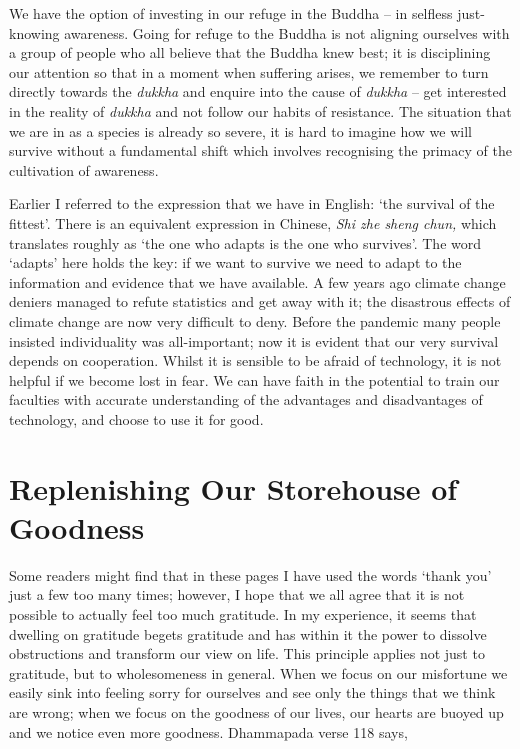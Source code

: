 We have the option of investing in our refuge in the Buddha -- in
selfless just-knowing awareness. Going for refuge to the Buddha is not
aligning ourselves with a group of people who all believe that the
Buddha knew best; it is disciplining our attention so that in a moment
when suffering arises, we remember to turn directly towards the
\emph{dukkha} and enquire into the cause of \emph{dukkha} -- get
interested in the reality of \emph{dukkha} and not follow our habits of
resistance. The situation that we are in as a species is already so
severe, it is hard to imagine how we will survive without a fundamental
shift which involves recognising the primacy of the cultivation of
awareness.

Earlier I referred to the expression that we have in English: `the
survival of the fittest'. There is an equivalent expression in Chinese,
\emph{Shi zhe sheng chun,} which translates roughly as `the one who
adapts is the one who survives'. The word `adapts' here holds the key:
if we want to survive we need to adapt to the information and evidence
that we have available. A few years ago climate change deniers managed
to refute statistics and get away with it; the disastrous effects of
climate change are now very difficult to deny. Before the pandemic many
people insisted individuality was all-important; now it is evident that
our very survival depends on cooperation. Whilst it is sensible to be
afraid of technology, it is not helpful if we become lost in fear. We
can have faith in the potential to train our faculties with accurate
understanding of the advantages and disadvantages of technology, and
choose to use it for good.

\section{Replenishing Our Storehouse of Goodness}

Some readers might find that in these pages I have used the words `thank
you' just a few too many times; however, I hope that we all agree that
it is not possible to actually feel too much gratitude. In my
experience, it seems that dwelling on gratitude begets gratitude and has within it the
power to dissolve obstructions and transform our view on life. This
principle applies not just to gratitude, but to wholesomeness in general.
When we focus on our misfortune we easily sink into feeling sorry for
ourselves and see only the things that we think are wrong; when we focus
on the goodness of our lives, our hearts are buoyed up and we notice
even more goodness. Dhammapada verse 118 says,

